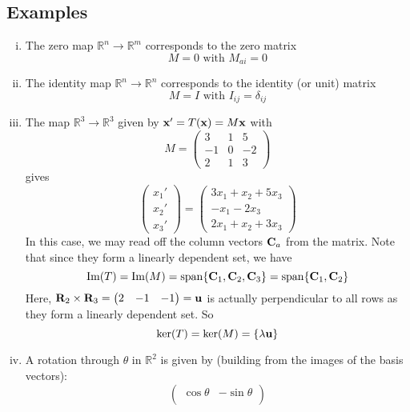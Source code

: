 \documentclass{article}
\begin{document}
\subsection{Examples}
\begin{enumerate}[(i)]
    \item The zero map $\mathbb R^n \to \mathbb R^m$ corresponds to the zero matrix
          \[ M = 0 \text{ with } M_{ai} = 0 \]
    \item The identity map $\mathbb R^n \to \mathbb R^n$ corresponds to the identity (or unit) matrix
          \[ M = I \text{ with } I_{ij} = \delta_{ij} \]
    \item The map $\mathbb R^3 \to \mathbb R^3$ given by $\vb x' = T(\vb x) = M\vb x$ with
          \[ M = \begin{pmatrix}
                  3  & 1 & 5  \\
                  -1 & 0 & -2 \\
                  2  & 1 & 3
              \end{pmatrix} \]
          gives
          \[
              \begin{pmatrix}
                  x_1' \\ x_2' \\ x_3'
              \end{pmatrix}
              =
              \begin{pmatrix}
                  3x_1 + x_2 + 5x_3 \\
                  -x_1 - 2x_3       \\
                  2x_1 + x_2 + 3x_3
              \end{pmatrix}
          \]
          In this case, we may read off the column vectors $\vb C_a$ from the matrix. Note that since they form a linearly dependent set, we have
          \[ \Im(T) = \Im(M) = \operatorname{span} \{ \vb C_1, \vb C_2, \vb C_3 \} = \operatorname{span} \{ \vb C_1, \vb C_2 \} \]
          Here, $\vb R_2 \times \vb R_3 = \begin{pmatrix}
                  2 & -1 & -1
              \end{pmatrix} = \vb u$ is actually perpendicular to all rows as they form a linearly dependent set. So
          \[ \ker(T) = \ker(M) = \{ \lambda \vb u \} \]
    \item A rotation through $\theta$ in $\mathbb R^2$ is given by (building from the images of the basis vectors):
          \[ \begin{pmatrix}
                  \cos \theta & -\sin \theta \\

\end{pmatrix}\]
\end{enumerate}
\end{document}
